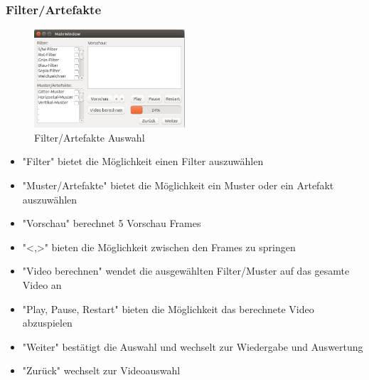 \documentclass[parskip=full]{scrartcl}
\begin{document}
\subsubsection{Filter/Artefakte}
\begin{figure}[htbp] 
\centering
\includegraphics[width=0.5\textwidth]{GUI_Entwurf_1/GUI_3.png}
\caption{Filter/Artefakte Auswahl}
\end{figure}
\begin{itemize}
\item "Filter" bietet die Möglichkeit einen Filter auszuwählen
\item "Muster/Artefakte" bietet die Möglichkeit ein Muster oder ein Artefakt auszuwählen
\item "Vorschau" berechnet 5 Vorschau Frames
\item "<,>" bieten die Möglichkeit zwischen den Frames zu springen
\item "Video berechnen" wendet die ausgewählten Filter/Muster auf das gesamte Video an
\item "Play, Pause, Restart" bieten die Möglichkeit das berechnete Video abzuspielen
\item "Weiter" bestätigt die Auswahl und wechselt zur Wiedergabe und Auswertung
\item "Zurück" wechselt zur Videoauswahl
\end{itemize}
\end{document}

